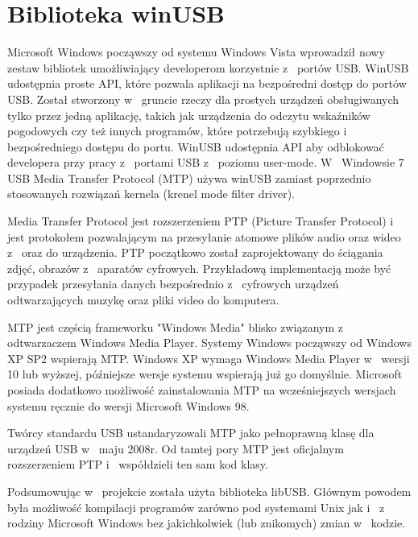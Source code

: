 \documentclass{BscUS}
\begin{document}
\section{Biblioteka winUSB}
Microsoft Windows począwszy od systemu Windows Vista wprowadził nowy zestaw bibliotek umożliwiający developerom korzystnie z~ portów USB. WinUSB udostępnia proste API, które pozwala aplikacji na bezpośredni dostęp do portów USB. Został stworzony w~ gruncie rzeczy dla prostych urządzeń obsługiwanych tylko przez jedną aplikację, takich jak urządzenia do odczytu wskaźników pogodowych czy też innych programów, które potrzebują szybkiego i~ bezpośredniego dostępu do portu. WinUSB udostępnia API aby odblokować developera przy pracy z~ portami USB z~ poziomu user-mode. W~ Windowsie 7 USB Media Transfer Protocol (MTP) używa winUSB zamiast poprzednio stosowanych rozwiązań kernela (krenel mode filter driver).

Media Transfer Protocol jest rozszerzeniem PTP (Picture Transfer Protocol) i~ jest protokołem pozwalającym na przesyłanie atomowe plików audio oraz wideo z~ oraz do urządzenia. PTP początkowo został zaprojektowany do ściągania zdjęć, obrazów z~ aparatów cyfrowych. Przykładową implementacją może być przypadek przesyłania danych bezpośrednio z~ cyfrowych urządzeń odtwarzających muzykę oraz pliki video do komputera.

MTP jest częścią frameworku "Windows Media" blisko związanym z~ odtwarzaczem Windows Media Player. Systemy Windows począwszy od Windows XP SP2 wspierają MTP. Windows XP wymaga Windows Media Player w~ wersji 10 lub wyższej, późniejsze wersje systemu wspierają już go domyślnie. Microsoft posiada dodatkowo możliwość zainstalowania MTP na wcześniejszych wersjach systemu ręcznie do wersji Microsoft Windows 98.

Twórcy standardu USB ustandaryzowali MTP jako pełnoprawną klasę dla urządzeń USB w~ maju 2008r.
Od tamtej pory MTP jest oficjalnym rozszerzeniem PTP i~ współdzieli ten sam kod klasy. \cite{winusbDesc, micrDevAppUSBDev, micrAccUsbDev, micCommWithUsb}
\newline

\indent Podsumowując w~ projekcie została użyta biblioteka libUSB. Głównym powodem była możliwość kompilacji programów zarówno pod systemami Unix jak i~ z~ rodziny Microsoft Windows bez jakichkolwiek (lub znikomych) zmian w~ kodzie.
\end{document}
